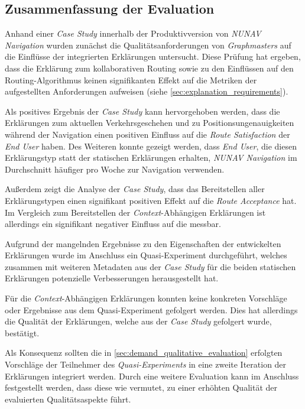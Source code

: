 \subsection{Zusammenfassung der Evaluation}

Anhand einer \textit{Case Study} innerhalb der Produktivversion von \textit{NUNAV Navigation} wurden zunächst die Qualitätsanforderungen von \textit{Graphmasters} auf die Einflüsse der integrierten Erklärungen untersucht. Diese Prüfung hat ergeben, dass die Erklärung zum kollaborativen Routing sowie zu den Einflüssen auf den Routing-Algorithmus keinen signifikanten Effekt auf die Metriken der aufgestellten Anforderungen aufweisen (siehe \autoref{sec:explanation_requirements}).

Als positives Ergebnis der \textit{Case Study} kann hervorgehoben werden, dass die Erklärungen zum aktuellen Verkehrsgeschehen und zu Positionsungenauigkeiten während der Navigation einen positiven Einfluss auf die \textit{Route Satisfaction} der \textit{End User} haben. Des Weiteren konnte gezeigt werden, dass \textit{End User}, die diesen Erklärungstyp statt der statischen Erklärungen erhalten, \textit{NUNAV Navigation} im Durchschnitt häufiger pro Woche zur Navigation verwenden.

Außerdem zeigt die Analyse der \textit{Case Study}, dass das Bereitstellen aller Erklärungstypen einen signifikant positiven Effekt auf die \textit{Route Acceptance} hat. Im Vergleich zum Bereitstellen der \textit{Context}-Abhängigen Erklärungen ist allerdings ein signifikant negativer Einfluss auf die  messbar.

Aufgrund der mangelnden Ergebnisse zu den Eigenschaften der entwickelten Erklärungen wurde im Anschluss ein Quasi-Experiment durchgeführt, welches zusammen mit weiteren Metadaten aus der \textit{Case Study} für die beiden statischen Erklärungen potenzielle Verbesserungen herausgestellt hat.

Für die \textit{Context}-Abhängigen Erklärungen konnten keine konkreten Vorschläge oder Ergebnisse aus dem Quasi-Experiment gefolgert werden. Dies hat allerdings die Qualität der Erklärungen, welche aus der \textit{Case Study} gefolgert wurde, bestätigt.

Als Konsequenz sollten die in \autoref{sec:demand_qualitative_evaluation} erfolgten Vorschläge der Teilnehmer des \textit{Quasi-Experiments} in eine zweite Iteration der Erklärungen integriert werden. Durch eine weitere Evaluation kann im Anschluss festgestellt werden, dass diese wie vermutet, zu einer erhöhten Qualität der evaluierten Qualitätsaspekte führt.

